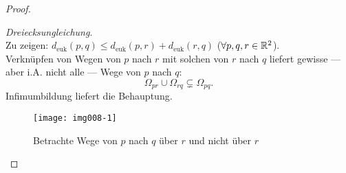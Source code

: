 \begin{theorem}
\begin{proof}
\begin{itemize}
      \begin{minipage}{.45\textwidth}
        \item \emph{Dreiecksungleichung}. \\
          Zu zeigen: $ d_\text{euk}(p,q) \leq d_\text{euk}(p,r) + d_\text{euk}(r,q) $ ($ \forall p, q, r \in \mathbb{R}^2 $). \\
          Verknüpfen von Wegen von $ p $ nach $ r $ mit solchen von $ r $ nach $ q $ liefert gewisse --- aber i.A. nicht alle --- Wege von $ p $ nach $ q $:
          \begin{equation*}
            \Omega_{pr} \cup \Omega_{rq} \subsetneq \Omega_{pq}\text{.}
          \end{equation*}
          Infimumbildung liefert die Behauptung.
      \end{minipage}
      \hfill
      \begin{minipage}{.45\textwidth}
        \begin{figure}[H]
          \label{img008-1}
          \texttt{[image: img008-1]}
          \caption{Betrachte Wege von $ p $ nach $ q $ über $ r $ und nicht über $ r $}
        \end{figure}
      \end{minipage}


\end{itemize}
\end{proof}
\end{theorem}
